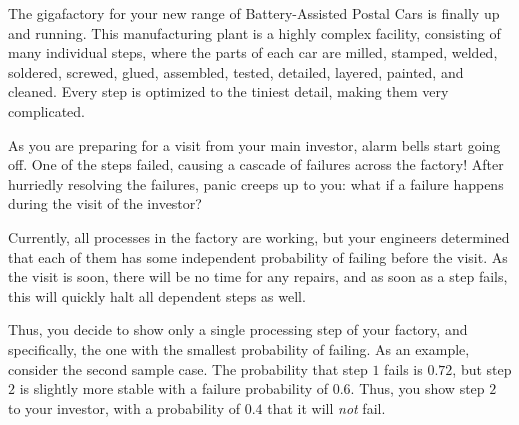 \problemname{}


\newcommand{\maxn}{10^5}

The gigafactory for your new range of Battery-Assisted Postal Cars is finally up and running.
This manufacturing plant is a highly complex facility, consisting of many individual steps,
where the parts of each car are
milled, stamped, welded, soldered, screwed, glued, assembled, tested, detailed, layered, painted, and cleaned.
Every step is optimized to the tiniest detail, making them very complicated.

As you are preparing for a visit from your main investor,
alarm bells start going off.
One of the steps failed, causing a cascade of failures across the factory!
After hurriedly resolving the failures, panic creeps up to you:
what if a failure happens during the visit of the investor?


Currently, all processes in the factory are working, but your engineers determined that each
of them has some independent probability of failing before the visit.
As the visit is soon, there will be no time for any repairs, and
as soon as a step fails, this will quickly halt all dependent steps as well.

Thus, you decide to show only a single processing step of your factory,
and specifically, the one with the smallest probability of failing.
As an example, consider the second sample case.
The probability that step $1$ fails is $0.72$,
but step $2$ is slightly more stable with a failure probability of $0.6$.
Thus, you show step $2$ to your investor, with a probability of $0.4$ that it will \emph{not} fail.


